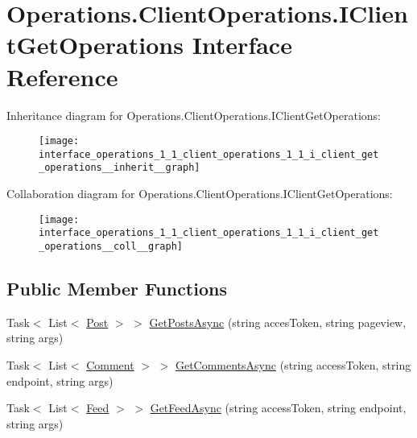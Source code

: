 \hypertarget{interface_operations_1_1_client_operations_1_1_i_client_get_operations}{}\section{Operations.\+Client\+Operations.\+I\+Client\+Get\+Operations Interface Reference}
\label{interface_operations_1_1_client_operations_1_1_i_client_get_operations}


Inheritance diagram for Operations.\+Client\+Operations.\+I\+Client\+Get\+Operations\+:
\nopagebreak
\begin{figure}[H]
\begin{center}
\leavevmode
\texttt{[image: interface\_operations\_1\_1\_client\_operations\_1\_1\_i\_client\_get\_operations\_\_inherit\_\_graph]}
\end{center}
\end{figure}


Collaboration diagram for Operations.\+Client\+Operations.\+I\+Client\+Get\+Operations\+:
\nopagebreak
\begin{figure}[H]
\begin{center}
\leavevmode
\texttt{[image: interface\_operations\_1\_1\_client\_operations\_1\_1\_i\_client\_get\_operations\_\_coll\_\_graph]}
\end{center}
\end{figure}
\subsection*{Public Member Functions}
\begin{DoxyCompactItemize}
\item 
Task$<$ List$<$ \hyperlink{class_data_1_1_facebook_objects_1_1_post}{Post} $>$ $>$ \hyperlink{interface_operations_1_1_client_operations_1_1_i_client_get_operations_ad082c4c82e7cd14d578720d367bb3b3b}{Get\+Posts\+Async} (string acces\+Token, string pageview, string args)
\item 
Task$<$ List$<$ \hyperlink{class_data_1_1_facebook_objects_1_1_comment}{Comment} $>$ $>$ \hyperlink{interface_operations_1_1_client_operations_1_1_i_client_get_operations_ae0b222ad5125059baf1201cfeab1abb8}{Get\+Comments\+Async} (string access\+Token, string endpoint, string args)
\item 
Task$<$ List$<$ \hyperlink{class_data_1_1_facebook_objects_1_1_feed}{Feed} $>$ $>$ \hyperlink{interface_operations_1_1_client_operations_1_1_i_client_get_operations_aa4bb87015ba04344e281036d100bf3e7}{Get\+Feed\+Async} (string access\+Token, string endpoint, string args)
\end{DoxyCompactItemize}


